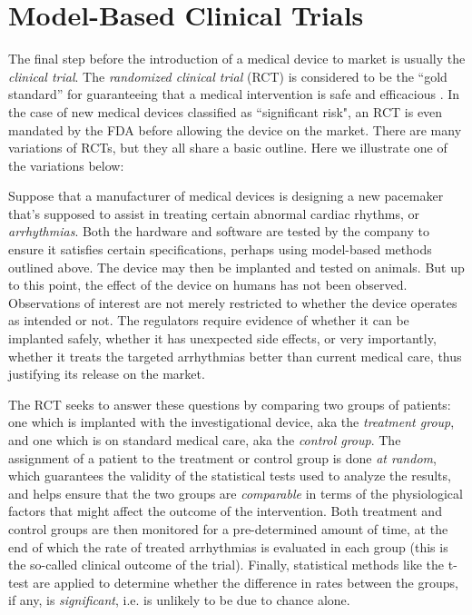 \section{Model-Based Clinical Trials}
The final step before the introduction of a medical device to market is usually the \emph{clinical trial}.
The \emph{randomized clinical trial} (RCT) is considered to be the ``gold standard'' for guaranteeing that a medical intervention is safe and efficacious \cite{FriedmanFD10_ClinicalTrials}.
In the case of new medical devices classified as ``significant risk", an RCT is even mandated by the FDA before allowing the device on the market.
There are many variations of RCTs, but they all share a basic outline.
Here we illustrate one of the variations below: %

Suppose that a manufacturer of medical devices is designing a new pacemaker that's supposed to assist in treating certain abnormal cardiac rhythms, or \emph{arrhythmias}.  
Both the hardware and software are tested by the company to ensure it satisfies certain specifications, perhaps using model-based methods outlined above.
The device may then be implanted and tested on animals. 
But up to this point, the effect of the device on humans has not been observed. 
Observations of interest are not merely restricted to whether the device operates as intended or not. 
The regulators require evidence of whether it can be implanted safely, whether it has unexpected side effects, or very importantly, whether it treats the targeted arrhythmias better than current medical care, thus justifying its release on the market.

The RCT seeks to answer these questions by comparing two groups of patients: one which is implanted with the investigational device, aka the \emph{treatment group}, and one which is on standard medical care, aka the \emph{control group}. 
The assignment of a patient to the treatment or control group is done \emph{at random}, which guarantees the validity of the statistical tests used to analyze the results, and helps ensure that the two groups are \emph{comparable} in terms of the physiological factors that might affect the outcome of the intervention.
Both treatment and control groups are then monitored for a pre-determined amount of time, at the end of which the rate of treated arrhythmias is evaluated in each group (this is the so-called clinical outcome of the trial).
Finally, statistical methods like the t-test are applied to determine whether the difference in rates between the groups, if any, is \emph{significant}, i.e. is unlikely to be due to chance alone.

